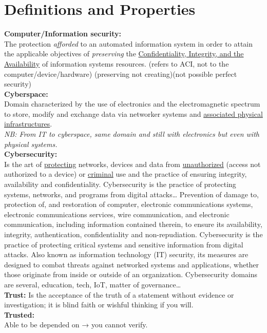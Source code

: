 
\chapter{Definitions and Properties}

\textbf{Computer/Information security:}
\\The protection \textit{afforded} to an automated information system in order to attain the applicable objectives of \textit{preserving} the \underline{Confidentiality, Integrity, and the Availability} of information systems resources. (refers to ACI, not to the computer/device/hardware) (preserving not creating)(not possible perfect security)
\\\textbf{Cyberspace:}
\\Domain characterized by the use of electronics and the electromagnetic spectrum to store, modify and exchange data via networker systems and \underline{associated physical infrastructures}. \\\textit{NB: From IT to cyberspace, same domain and still with electronics but even with physical systems.}
\\\textbf{Cybersecurity:}
\\Is the art of \underline{protecting} networks, devices and data from \underline{unauthorized} (access not authorized to a device) or \underline{criminal} use and the practice of ensuring integrity, availability and confidentiality. Cybersecurity is the practice of protecting systems, networks, and programs from digital attacks… Prevention of damage to, protection of, and restoration of computer, electronic communications systems, electronic communications services, wire communication, and electronic communication, including information contained therein, to ensure its availability, integrity, authentication, confidentiality and non-repudiation. Cybersecurity is the practice of protecting critical systems and sensitive information from digital attacks. Also known as information technology (IT) security, its measures are designed to combat threats against networked systems and applications, whether those originate from inside or outside of an organization.
Cybersecurity domains are several, education, tech, IoT, matter of governance…
\\\textbf{Trust:}
Is the acceptance of the truth of a statement without evidence or investigation; it is blind faith or wishful thinking if you will.
\\\textbf{Trusted:}
\\Able to be depended on → you cannot verify.
